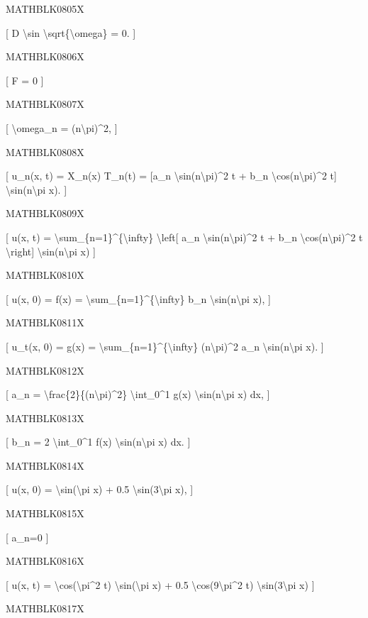 \documentclass[
]{article}
\begin{document}
MATHBLK0805X

{[} D \textbackslash sin \textbackslash sqrt\{\textbackslash omega\} =
0. {]}

MATHBLK0806X

{[} F = 0 {]}

MATHBLK0807X

{[} \textbackslash omega\_n = (n\textbackslash pi)\^{}2, {]}

MATHBLK0808X

{[} u\_n(x, t) = X\_n(x) T\_n(t) = {[}a\_n
\textbackslash sin(n\textbackslash pi)\^{}2 t + b\_n
\textbackslash cos(n\textbackslash pi)\^{}2 t{]}
\textbackslash sin(n\textbackslash pi x). {]}

MATHBLK0809X

{[} u(x, t) = \textbackslash sum\_\{n=1\}\^{}\{\textbackslash infty\}
\textbackslash left{[} a\_n \textbackslash sin(n\textbackslash pi)\^{}2
t + b\_n \textbackslash cos(n\textbackslash pi)\^{}2 t
\textbackslash right{]} \textbackslash sin(n\textbackslash pi x) {]}

MATHBLK0810X

{[} u(x, 0) = f(x) =
\textbackslash sum\_\{n=1\}\^{}\{\textbackslash infty\} b\_n
\textbackslash sin(n\textbackslash pi x), {]}

MATHBLK0811X

{[} u\_t(x, 0) = g(x) =
\textbackslash sum\_\{n=1\}\^{}\{\textbackslash infty\}
(n\textbackslash pi)\^{}2 a\_n \textbackslash sin(n\textbackslash pi x).
{]}

MATHBLK0812X

{[} a\_n = \textbackslash frac\{2\}\{(n\textbackslash pi)\^{}2\}
\textbackslash int\_0\^{}1 g(x) \textbackslash sin(n\textbackslash pi x)
dx, {]}

MATHBLK0813X

{[} b\_n = 2 \textbackslash int\_0\^{}1 f(x)
\textbackslash sin(n\textbackslash pi x) dx. {]}

MATHBLK0814X

{[} u(x, 0) = \textbackslash sin(\textbackslash pi x) + 0.5
\textbackslash sin(3\textbackslash pi x), {]}

MATHBLK0815X

{[} a\_n=0 {]}

MATHBLK0816X

{[} u(x, t) = \textbackslash cos(\textbackslash pi\^{}2 t)
\textbackslash sin(\textbackslash pi x) + 0.5
\textbackslash cos(9\textbackslash pi\^{}2 t)
\textbackslash sin(3\textbackslash pi x) {]}

MATHBLK0817X
\end{document}

